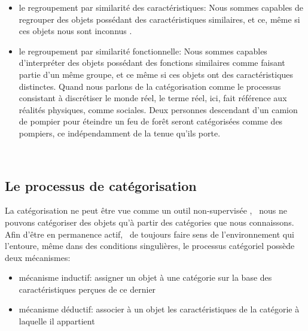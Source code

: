 \begin{itemize}
\item le regroupement par similarité des caractéristiques: Nous sommes capables de regrouper des objets possédant des caractéristiques similaires, et ce, même si ces objets nous sont inconnus \citep{fried1984induction}.
\item le regroupement par similarité fonctionnelle: Nous sommes capables d'interpréter des objets possédant des fonctions similaires comme faisant partie d'un même groupe, et ce même si ces objets ont des caractéristiques distinctes. Quand nous parlons de la catégorisation comme le processus consistant à discrétiser le monde réel, le terme réel, ici, fait référence aux réalités physiques, comme sociales. Deux personnes descendant d'un camion de pompier pour éteindre un feu de forêt seront catégorisées comme des pompiers, ce indépendamment de la tenue qu'ils porte. 
\end{itemize}



 \\

\subsection{Le processus de catégorisation}

La catégorisation ne peut être vue comme un outil non-supervisée , \ie~nous ne pouvons catégoriser des objets qu'à partir des catégories que nous connaissons. Afin d'être en permanence actif, \ie~de toujours faire sens de l'environnement qui l'entoure, même dans des conditions singulières, le processus catégoriel possède deux mécanismes:
\begin{itemize}
\item mécanisme inductif: assigner  un objet à une catégorie sur la base des caractéristiques perçues de ce dernier
\item mécanisme déductif: associer à un objet les caractéristiques de la catégorie à laquelle il appartient
\end{itemize}

